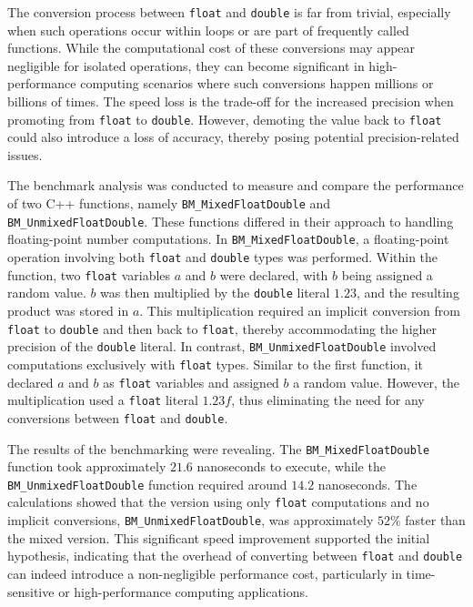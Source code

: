 \documentclass{article}
\theoremstyle{break}
\begin{document}
The conversion process between \texttt{float} and \texttt{double} is far from trivial, especially when such operations occur within loops or are part of frequently called functions. While the computational cost of these conversions may appear negligible for isolated operations, they can become significant in high-performance computing scenarios where such conversions happen millions or billions of times. The speed loss is the trade-off for the increased precision when promoting from \texttt{float} to \texttt{double}. However, demoting the value back to \texttt{float} could also introduce a loss of accuracy, thereby posing potential precision-related issues.

The benchmark analysis was conducted to measure and compare the performance of two C++ functions, namely \texttt{BM\_MixedFloatDouble} and \texttt{BM\_Unmixed\-FloatDouble}. These functions differed in their approach to handling floating-point number computations. In \texttt{BM\_MixedFloatDouble}, a floating-point operation involving both \texttt{float} and \texttt{double} types was performed. Within the function, two \texttt{float} variables \(a\) and \(b\) were declared, with \(b\) being assigned a random value. \(b\) was then multiplied by the \texttt{double} literal \(1.23\), and the resulting product was stored in \(a\). This multiplication required an implicit conversion from \texttt{float} to \texttt{double} and then back to \texttt{float}, thereby accommodating the higher precision of the \texttt{double} literal. In contrast, \texttt{BM\_UnmixedFloatDouble} involved computations exclusively with \texttt{float} types. Similar to the first function, it declared \(a\) and \(b\) as \texttt{float} variables and assigned \(b\) a random value. However, the multiplication used a \texttt{float} literal \(1.23f\), thus eliminating the need for any conversions between \texttt{float} and \texttt{double}.

The results of the benchmarking were revealing. The \texttt{BM\_MixedFloatDouble} function took approximately \(21.6\) nanoseconds to execute, while the \texttt{BM\_Unmixed\-FloatDouble} function required around \(14.2\) nanoseconds. The calculations showed that the version using only \texttt{float} computations and no implicit conversions, \texttt{BM\_Un\-mixedFloatDouble}, was approximately \(52\%\) faster than the mixed version. This significant speed improvement supported the initial hypothesis, indicating that the overhead of converting between \texttt{float} and \texttt{double} can indeed introduce a non-negligible performance cost, particularly in time-sensitive or high-performance computing applications.
\end{document}
